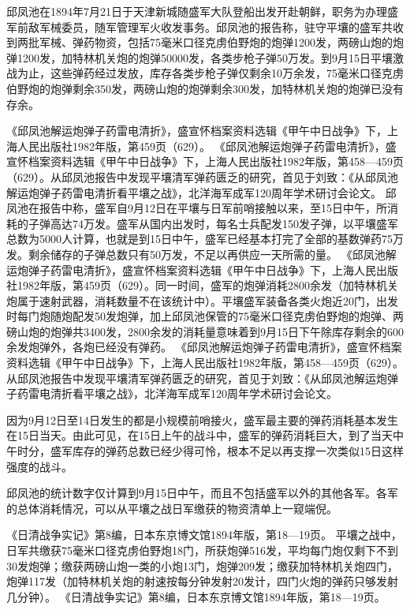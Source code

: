\documentclass[12pt,UTF8]{ctexbook}
\begin{document}
邱凤池在1894年7月21日于天津新城随盛军大队登船出发开赴朝鲜，职务为办理盛军前敌军械委员，随军管理军火收发事务。邱凤池的报告称，驻守平壤的盛军共收到两批军械、弹药物资，包括75毫米口径克虏伯野炮的炮弹1200发，两磅山炮的炮弹1200发，加特林机关炮的炮弹50000发，各类步枪子弹50万发。到9月15日平壤激战为止，这些弹药经过发放，库存各类步枪子弹仅剩余10万余发，75毫米口径克虏伯野炮的炮弹剩余350发，两磅山炮的炮弹剩余300发，加特林机关炮的炮弹已没有存余。

《邱凤池解运炮弹子药雷电清折》，盛宣怀档案资料选辑《甲午中日战争》下，上海人民出版社1982年版，第459页（629）。
《邱凤池解运炮弹子药雷电清折》，盛宣怀档案资料选辑《甲午中日战争》下，上海人民出版社1982年版，第458—459页（629）。从邱凤池报告中发现平壤清军弹药匮乏的研究，首见于刘致：《从邱凤池解运炮弹子药雷电清折看平壤之战》，北洋海军成军120周年学术研讨会论文。
邱凤池在报告中称，盛军自9月12日在平壤与日军前哨接触以来，至15日中午，所消耗的子弹高达74万发。盛军从国内出发时，每名士兵配发150发子弹，以平壤盛军总数为5000人计算，也就是到15日中午，盛军已经基本打完了全部的基数弹药75万发。剩余储存的子弹总数只有50万发，不足以再供应一天所需的量。 《邱凤池解运炮弹子药雷电清折》，盛宣怀档案资料选辑《甲午中日战争》下，上海人民出版社1982年版，第459页（629）。同一时间，盛军的炮弹消耗2800余发（加特林机关炮属于速射武器，消耗数量不在该统计中）。平壤盛军装备各类火炮近20门，出发时每门炮随炮配发50发炮弹，加上邱凤池保管的75毫米口径克虏伯野炮的炮弹、两磅山炮的炮弹共3400发，2800余发的消耗量意味着到9月15日下午除库存剩余的600余发炮弹外，各炮已经没有弹药。 《邱凤池解运炮弹子药雷电清折》，盛宣怀档案资料选辑《甲午中日战争》下，上海人民出版社1982年版，第458—459页（629）。从邱凤池报告中发现平壤清军弹药匮乏的研究，首见于刘致：《从邱凤池解运炮弹子药雷电清折看平壤之战》，北洋海军成军120周年学术研讨会论文。

因为9月12日至14日发生的都是小规模前哨接火，盛军最主要的弹药消耗基本发生在15日当天。由此可见，在15日上午的战斗中，盛军的弹药消耗巨大，到了当天中午时分，盛军库存的弹药总数已经少得可怜，根本不足以再支撑一次类似15日这样强度的战斗。

邱凤池的统计数字仅计算到9月15日中午，而且不包括盛军以外的其他各军。各军的总体消耗情况，可以从平壤之战日军缴获的物资清单上一窥端倪。

《日清战争实记》第8编，日本东京博文馆1894年版，第18—19页。
平壤之战中，日军共缴获75毫米口径克虏伯野炮18门，所获炮弹516发，平均每门炮仅剩下不到30发炮弹；缴获两磅山炮一类的小炮13门，炮弹209发；缴获加特林机关炮四门，炮弹117发（加特林机关炮的射速按每分钟发射20发计，四门火炮的弹药只够发射几分钟）。 《日清战争实记》第8编，日本东京博文馆1894年版，第18—19页。
\end{document}
